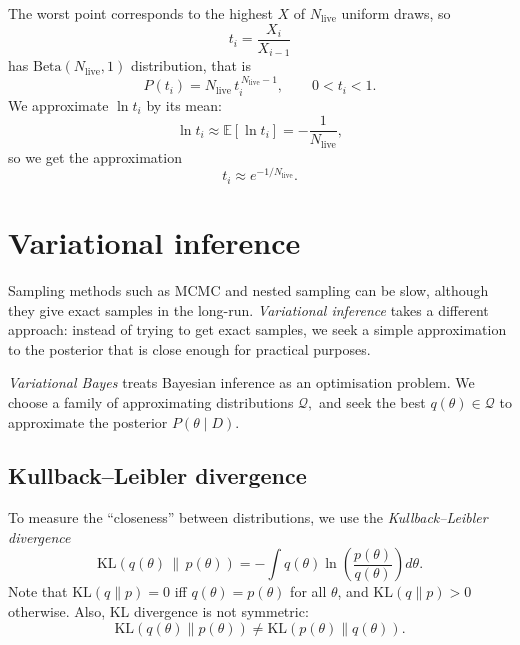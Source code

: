 \documentclass[11pt, titlepage]{article} %
\numberwithin{equation}{section}
\theoremstyle{definition}
\numberwithin{assumption}{section}
\begin{document}
The worst point corresponds to the highest $X$ of $N_{\mathrm{live}}$ uniform draws, so
\begin{equation*}
    t_i=\frac{X_i}{X_{i-1}}
\end{equation*}
has  $\mathrm{Beta}(N_{\mathrm{live}},1)$ distribution, that is
\begin{equation*}
    P(t_i)=N_{\mathrm{live}}\,t_i^{\,N_{\mathrm{live}}-1},
    \qquad 0<t_i<1.
\end{equation*}
We approximate $\ln t_i$ by its mean:
\begin{equation*}
    \ln t_i\approx\mathbb{E}[\ln t_i]=-\frac{1}{N_{\mathrm{live}}},
\end{equation*}
so we get the approximation
\begin{equation*}
    t_i \approx e^{-1/N_{\mathrm{live}}}.
\end{equation*}


\section{Variational inference}


Sampling methods such as MCMC and nested sampling can be slow, although they give exact samples in the long-run. \textit{Variational inference} takes a different approach: instead of trying to get exact samples, we seek a simple approximation to the posterior that is close enough for practical purposes.

\textit{Variational Bayes} treats Bayesian inference as an optimisation problem. We choose a family of approximating distributions
$\mathcal{Q},$
and seek the best
$q(\theta)\in \mathcal{Q}$
to approximate the posterior
$P(\theta\mid D).$

\subsection{Kullback--Leibler divergence}

To measure the ``closeness'' between distributions, we use the \textit{Kullback--Leibler divergence}
\begin{equation*}
    \mathrm{KL}(q(\theta)\,\|\,p(\theta))
    =
    -\int q(\theta)\ln\!\left(\frac{p(\theta)}{q(\theta)}\right)d\theta.
\end{equation*}
Note that $\mathrm{KL}(q\|p)=0$ iff $q(\theta)=p(\theta)$ for all $\theta$, and $\mathrm{KL}(q\|p)>0$ otherwise. Also, KL divergence is not symmetric:
\begin{equation*}
    \mathrm{KL}(q(\theta)\|p(\theta))
    \neq
    \mathrm{KL}(p(\theta)\|q(\theta)).
\end{equation*}
\end{document}
